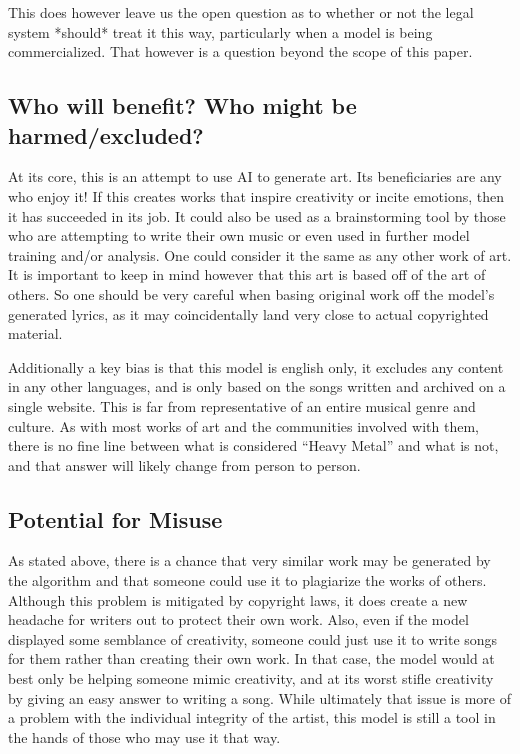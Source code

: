 \documentclass[11pt]{article}
\begin{document}
This does however leave us the open question as to whether or not the legal system *should* treat it this way, particularly when a model is being commercialized. That however is a question beyond the scope of this paper.

\subsection{Who will benefit? Who might be harmed/excluded?}

At its core, this is an attempt to use AI to generate art. Its beneficiaries are any who enjoy it! If this creates works that inspire creativity or incite emotions, then it has succeeded in its job. It could also be used as a brainstorming tool by those who are attempting to write their own music or even used in further model training and/or analysis. One could consider it the same as any other work of art. It is important to keep in mind however that this art is based off of the art of others. So one should be very careful when basing original work off the model’s generated lyrics, as it may coincidentally land very close to actual copyrighted material.

Additionally a key bias is that this model is english only, it excludes any content in any other languages, and is only based on the songs written and archived on a single website. This is far from representative of an entire musical genre and culture. As with most works of art and the communities involved with them, there is no fine line between what is considered “Heavy Metal” and what is not, and that answer will likely change from person to person.

\subsection{Potential for Misuse}

As stated above, there is a chance that very similar work may be generated by the algorithm and that someone could use it to plagiarize the works of others. Although this problem is mitigated by copyright laws, it does create a new headache for writers out to protect their own work. Also, even if the model displayed some semblance of creativity, someone could just use it to write songs for them rather than creating their own work. In that case, the model would at best only be helping someone mimic creativity, and at its worst stifle creativity by giving an easy answer to writing a song. While ultimately that issue is more of a problem with the individual integrity of the artist, this model is still a tool in the hands of those who may use it that way.
\end{document}
